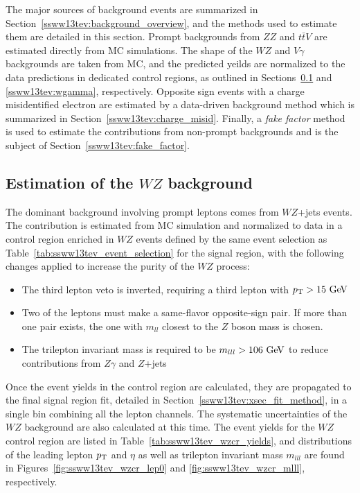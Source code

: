The major sources of background events are summarized in Section~\ref{ssww13tev:background_overview}, and the methods used to estimate them are detailed in this section.  
Prompt backgrounds from $ZZ$ and $t\bar{t}V$ are estimated directly from MC simulations.
The shape of the $WZ$ and $V\gamma$ backgrounds are taken from MC, and the predicted yeilds are normalized to the data predictions in dedicated control regions, as outlined in Sections~\ref{ssww13tev:wz} and \ref{ssww13tev:wgamma}, respectively.
Opposite sign events with a charge misidentified electron are estimated by a data-driven background method which is summarized in Section~\ref{ssww13tev:charge_misid}.
Finally, a \emph{fake factor} method is used to estimate the contributions from non-prompt backgrounds and is the subject of Section~\ref{ssww13tev:fake_factor}.

\subsection{Estimation of the $WZ$ background}\label{ssww13tev:wz}
The dominant background involving prompt leptons comes from $WZ$+jets events.
The contribution is estimated from MC simulation and normalized to data in a control region enriched in $WZ$ events defined by the same event selection as Table~\ref{tab:ssww13tev_event_selection} for the signal region, with the following changes applied to increase the purity of the $WZ$ process:
\begin{itemize}
\item The third lepton veto is inverted, requiring a third lepton with $\pt > 15\gev$
\item Two of the leptons must make a same-flavor opposite-sign pair. If more than one pair exists, the one with $m_{ll}$ closest to the $Z$ boson mass is chosen.
\item The trilepton invariant mass is required to be $m_{lll} > 106\gev$ to reduce contributions from $Z\gamma$ and $Z$+jets
\end{itemize}

Once the event yields in the control region are calculated, they are propagated to the final signal region fit, detailed in Section~\ref{ssww13tev:xsec_fit_method}, in a single bin combining all the lepton channels.
The systematic uncertainties of the $WZ$ background are also calculated at this time.
The event yields for the $WZ$ control region are listed in Table~\ref{tab:ssww13tev_wzcr_yields}, and distributions of the leading lepton $p_{\mathrm{T}}$ and $\eta$ as well as trilepton invariant mass $m_{lll}$ are found in Figures~\ref{fig:ssww13tev_wzcr_lep0} and \ref{fig:ssww13tev_wzcr_mlll}, respectively.

